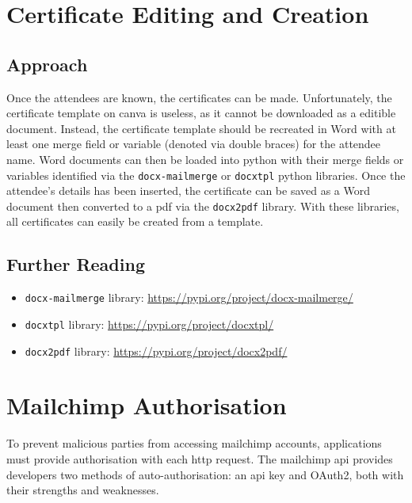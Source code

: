 \documentclass[11pt]{article}
\begin{document}
\newpage

\section{Certificate Editing and Creation}

\subsection{Approach}

Once the attendees are known, the certificates can be made. Unfortunately, the certificate template on \Gls{canva} is useless, as it cannot be downloaded as a editible document. Instead, the certificate template should be recreated in Word with at least one merge field or variable (denoted via double braces) for the attendee name. Word documents can then be loaded into \Gls{python} with their merge fields or variables identified via the \texttt{docx-mailmerge} or \texttt{docxtpl} \Gls{python} libraries. Once the attendee's details has been inserted, the certificate can be saved as a Word document then converted to a \acrshort{pdf} via the \texttt{docx2pdf} \gls{library}. With these libraries, all certificates can easily be created from a template.

\subsection{Further Reading}

\begin{itemize}
    \item \texttt{docx-mailmerge} \gls{library}: \url{https://pypi.org/project/docx-mailmerge/}
    \item \texttt{docxtpl} \gls{library}: \url{https://pypi.org/project/docxtpl/}
    \item \texttt{docx2pdf} \gls{library}: \url{https://pypi.org/project/docx2pdf/}
\end{itemize}

\newpage

\section{Mailchimp Authorisation}

To prevent malicious parties from accessing \Gls{mailchimp} accounts, applications must provide authorisation with each \acrshort{http} \gls{request}. The \Gls{mailchimp} \acrshort{api} provides developers two methods of auto-authorisation: an \acrshort{api} key and OAuth2, both with their strengths and weaknesses.
\end{document}
